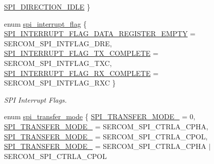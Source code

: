 \begin{DoxyCompactItemize}
\mbox{\hyperlink{group__asfdoc__sam0__sercom__spi__group_gga3790f767d410bc7d70fe0772fe7044f7aab6b2f188e1dc97b2024138ef1a45ad5}{S\+P\+I\+\_\+\+D\+I\+R\+E\+C\+T\+I\+O\+N\+\_\+\+I\+D\+LE}}
 \}
\item 
enum \mbox{\hyperlink{group__asfdoc__sam0__sercom__spi__group_ga16bab5d19c43ffb25c0d3f1e071813de}{spi\+\_\+interrupt\+\_\+flag}} \{ \mbox{\hyperlink{group__asfdoc__sam0__sercom__spi__group_gga16bab5d19c43ffb25c0d3f1e071813deab47cccbc2e81d8af9d6c1fd777a95762}{S\+P\+I\+\_\+\+I\+N\+T\+E\+R\+R\+U\+P\+T\+\_\+\+F\+L\+A\+G\+\_\+\+D\+A\+T\+A\+\_\+\+R\+E\+G\+I\+S\+T\+E\+R\+\_\+\+E\+M\+P\+TY}} = S\+E\+R\+C\+O\+M\+\_\+\+S\+P\+I\+\_\+\+I\+N\+T\+F\+L\+A\+G\+\_\+\+D\+RE, 
\mbox{\hyperlink{group__asfdoc__sam0__sercom__spi__group_gga16bab5d19c43ffb25c0d3f1e071813deacc9db35e4654be2e4bd06d2a10fb3837}{S\+P\+I\+\_\+\+I\+N\+T\+E\+R\+R\+U\+P\+T\+\_\+\+F\+L\+A\+G\+\_\+\+T\+X\+\_\+\+C\+O\+M\+P\+L\+E\+TE}} = S\+E\+R\+C\+O\+M\+\_\+\+S\+P\+I\+\_\+\+I\+N\+T\+F\+L\+A\+G\+\_\+\+T\+XC, 
\mbox{\hyperlink{group__asfdoc__sam0__sercom__spi__group_gga16bab5d19c43ffb25c0d3f1e071813deabc7fa74e9f37b6aa492ca9889e7d8a92}{S\+P\+I\+\_\+\+I\+N\+T\+E\+R\+R\+U\+P\+T\+\_\+\+F\+L\+A\+G\+\_\+\+R\+X\+\_\+\+C\+O\+M\+P\+L\+E\+TE}} = S\+E\+R\+C\+O\+M\+\_\+\+S\+P\+I\+\_\+\+I\+N\+T\+F\+L\+A\+G\+\_\+\+R\+XC
 \}
\begin{DoxyCompactList}\small\item\em S\+PI Interrupt Flags. \end{DoxyCompactList}\item 
enum \mbox{\hyperlink{group__asfdoc__sam0__sercom__spi__group_ga9c30fdfffba6be76b4044ccb17b218e5}{spi\+\_\+transfer\+\_\+mode}} \{ \mbox{\hyperlink{group__asfdoc__sam0__sercom__spi__group_gga9c30fdfffba6be76b4044ccb17b218e5addcbccd52e926858945de2e140199027}{S\+P\+I\+\_\+\+T\+R\+A\+N\+S\+F\+E\+R\+\_\+\+M\+O\+D\+E\+\_}} = 0, 
\mbox{\hyperlink{group__asfdoc__sam0__sercom__spi__group_gga9c30fdfffba6be76b4044ccb17b218e5aa55ca25e3c49ff34464adc654d14cfd5}{S\+P\+I\+\_\+\+T\+R\+A\+N\+S\+F\+E\+R\+\_\+\+M\+O\+D\+E\+\_}} = S\+E\+R\+C\+O\+M\+\_\+\+S\+P\+I\+\_\+\+C\+T\+R\+L\+A\+\_\+\+C\+P\+HA, 
\mbox{\hyperlink{group__asfdoc__sam0__sercom__spi__group_gga9c30fdfffba6be76b4044ccb17b218e5a29f104b5325a068ab32e652e21a1ec95}{S\+P\+I\+\_\+\+T\+R\+A\+N\+S\+F\+E\+R\+\_\+\+M\+O\+D\+E\+\_}} = S\+E\+R\+C\+O\+M\+\_\+\+S\+P\+I\+\_\+\+C\+T\+R\+L\+A\+\_\+\+C\+P\+OL, 
\mbox{\hyperlink{group__asfdoc__sam0__sercom__spi__group_gga9c30fdfffba6be76b4044ccb17b218e5a98dfa4850997601437f5183699d9e63c}{S\+P\+I\+\_\+\+T\+R\+A\+N\+S\+F\+E\+R\+\_\+\+M\+O\+D\+E\+\_}} = S\+E\+R\+C\+O\+M\+\_\+\+S\+P\+I\+\_\+\+C\+T\+R\+L\+A\+\_\+\+C\+P\+HA $\vert$ S\+E\+R\+C\+O\+M\+\_\+\+S\+P\+I\+\_\+\+C\+T\+R\+L\+A\+\_\+\+C\+P\+OL

\end{DoxyCompactItemize}
